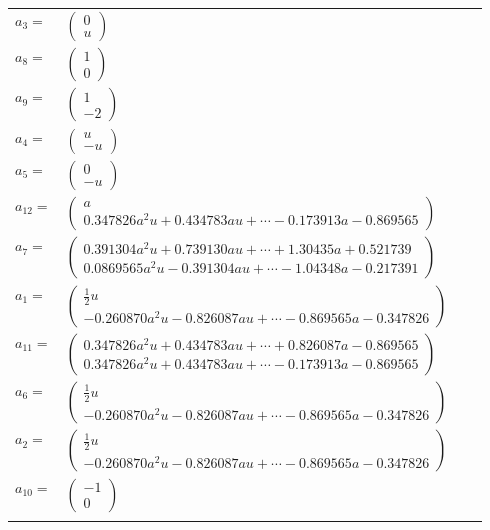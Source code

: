\documentclass[1p]{elsarticle_modified}
\theoremstyle{definition}
\begin{document}
\begin{tabular}{m{7pt} m{180pt} m{7pt} m{180pt} }
\flushright $a_{3}=$&$\begin{pmatrix}0\\u\end{pmatrix}$ \\
\flushright $a_{8}=$&$\begin{pmatrix}1\\0\end{pmatrix}$ \\
\flushright $a_{9}=$&$\begin{pmatrix}1\\-2\end{pmatrix}$ \\
\flushright $a_{4}=$&$\begin{pmatrix}u\\- u\end{pmatrix}$ \\
\flushright $a_{5}=$&$\begin{pmatrix}0\\- u\end{pmatrix}$ \\
\flushright $a_{12}=$&$\begin{pmatrix}a\\0.347826 a^{2} u+0.434783 a u+\cdots-0.173913 a-0.869565\end{pmatrix}$ \\
\flushright $a_{7}=$&$\begin{pmatrix}0.391304 a^{2} u+0.739130 a u+\cdots+1.30435 a+0.521739\\0.0869565 a^{2} u-0.391304 a u+\cdots-1.04348 a-0.217391\end{pmatrix}$ \\
\flushright $a_{1}=$&$\begin{pmatrix}\frac{1}{2} u\\-0.260870 a^{2} u-0.826087 a u+\cdots-0.869565 a-0.347826\end{pmatrix}$ \\
\flushright $a_{11}=$&$\begin{pmatrix}0.347826 a^{2} u+0.434783 a u+\cdots+0.826087 a-0.869565\\0.347826 a^{2} u+0.434783 a u+\cdots-0.173913 a-0.869565\end{pmatrix}$ \\
\flushright $a_{6}=$&$\begin{pmatrix}\frac{1}{2} u\\-0.260870 a^{2} u-0.826087 a u+\cdots-0.869565 a-0.347826\end{pmatrix}$ \\
\flushright $a_{2}=$&$\begin{pmatrix}\frac{1}{2} u\\-0.260870 a^{2} u-0.826087 a u+\cdots-0.869565 a-0.347826\end{pmatrix}$ \\
\flushright $a_{10}=$&$\begin{pmatrix}-1\\0\end{pmatrix}$\\&\end{tabular}
\end{document}
